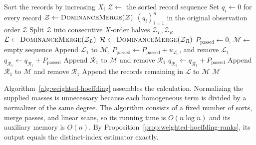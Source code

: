 \begin{algorithm}[ht]
  \caption{Weighted bivariate ranks by dominance merge sort}
  \label{alg:weighted-bivariate-ranks}
  \small
  \begin{algorithmic}[1]
      \State Sort the records by increasing $X_i$
      \State $\mathcal Z\gets$ the sorted record sequence
      \State Set $q_i\gets0$ for every record
      \State $\mathcal Z\gets\Call{DominanceMerge}{\mathcal Z}$
      \State \Return $(q_i)_{i=1}^n$ in the original observation order
    \EndProcedure
    \Statex
        \State \Return $\mathcal Z$
      \EndIf
      \State Split $\mathcal Z$ into consecutive $X$-order halves
        $\mathcal Z_L,\mathcal Z_R$
      \State $\mathcal L\gets\Call{DominanceMerge}{\mathcal Z_L}$
      \State $\mathcal R\gets\Call{DominanceMerge}{\mathcal Z_R}$
      \State $P_{\mathrm{passed}}\gets0$, $\mathcal M\gets$ empty sequence
          \label{alg:dominance-strict}
          \State Append $\mathcal L_1$ to $\mathcal M$,
            $P_{\mathrm{passed}}\gets P_{\mathrm{passed}}+u_{\mathcal L_1}$,
            and remove $\mathcal L_1$
        \Else
          \State $q_{\mathcal R_1}\gets q_{\mathcal R_1}+P_{\mathrm{passed}}$
          \State Append $\mathcal R_1$ to $\mathcal M$ and remove
            $\mathcal R_1$
        \EndIf
      \EndWhile
        \State $q_{\mathcal R_1}\gets q_{\mathcal R_1}+P_{\mathrm{passed}}$
        \State Append $\mathcal R_1$ to $\mathcal M$ and remove
          $\mathcal R_1$
      \EndFor
      \State Append the records remaining in $\mathcal L$ to $\mathcal M$
      \State \Return $\mathcal M$
    \EndFunction
  \end{algorithmic}
\end{algorithm}

Algorithm~\ref{alg:weighted-hoeffding} assembles the calculation. Normalizing
the supplied masses is unnecessary because each homogeneous term is divided by
a normalizer of the same degree. The algorithm consists of a fixed number of
sorts, merge passes, and linear scans, so its running time is $O(n\log n)$ and
its auxiliary memory is $O(n)$. By
Proposition~\ref{prop:weighted-hoeffding-ranks}, its output equals the
distinct-index estimator exactly.

